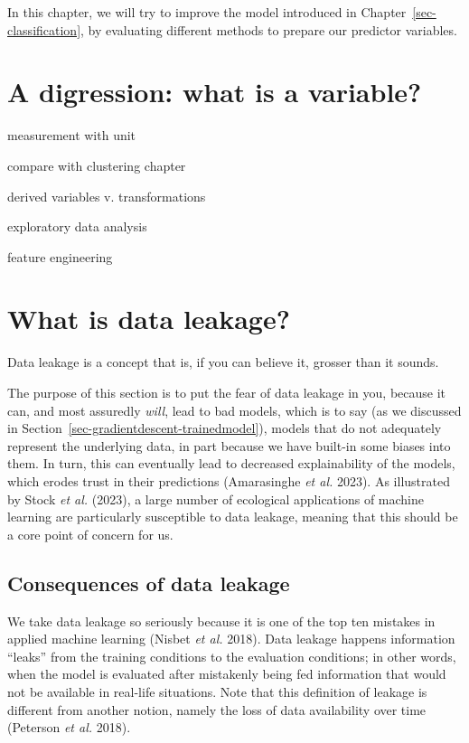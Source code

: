 \documentclass[
  letterpaper,
]{scrbook}
\begin{document}
In this chapter, we will try to improve the model introduced in
Chapter~\ref{sec-classification}, by evaluating different methods to
prepare our predictor variables.

\section{A digression: what is a
variable?}\label{a-digression-what-is-a-variable}

measurement with unit

compare with clustering chapter

derived variables v. transformations

exploratory data analysis

feature engineering

\section{What is data leakage?}\label{sec-leakage}

Data leakage is a concept that is, if you can believe it, grosser than
it sounds.

The purpose of this section is to put the fear of data leakage in you,
because it can, and most assuredly \emph{will}, lead to bad models,
which is to say (as we discussed in
Section~\ref{sec-gradientdescent-trainedmodel}), models that do not
adequately represent the underlying data, in part because we have
built-in some biases into them. In turn, this can eventually lead to
decreased explainability of the models, which erodes trust in their
predictions (Amarasinghe \emph{et al.} 2023). As illustrated by Stock
\emph{et al.} (2023), a large number of ecological applications of
machine learning are particularly susceptible to data leakage, meaning
that this should be a core point of concern for us.

\subsection{Consequences of data
leakage}\label{sec-leakage-consequences}

We take data leakage so seriously because it is one of the top ten
mistakes in applied machine learning (Nisbet \emph{et al.} 2018). Data
leakage happens information ``leaks'' from the training conditions to
the evaluation conditions; in other words, when the model is evaluated
after mistakenly being fed information that would not be available in
real-life situations. Note that this definition of leakage is different
from another notion, namely the loss of data availability over time
(Peterson \emph{et al.} 2018).
\end{document}
